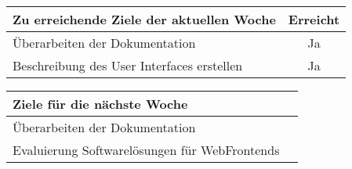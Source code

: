 \begin{tabularx}{\textwidth}{Xc}
    \arrayrulecolor{OliveGreen}
    \toprule
    {\bfseries Zu erreichende Ziele der aktuellen Woche} & {\bfseries Erreicht} \\
    \midrule[2pt]
    Überarbeiten der Dokumentation                         &Ja               \\
    \rowcolor{OliveGreen!15}
    Beschreibung des User Interfaces erstellen             &Ja               \\
   \bottomrule[2pt]
\end{tabularx}
%
\vspace{1cm}
%
\begin{tabularx}{\textwidth}{Xc}
    \arrayrulecolor{OliveGreen}
    \toprule
    {\bfseries Ziele für die nächste Woche}        &                         \\
    \midrule[2pt]
    Überarbeiten der Dokumentation                 &                         \\
    \rowcolor{OliveGreen!15}
    Evaluierung Softwarelösungen für WebFrontends  &                         \\
\end{tabularx}
